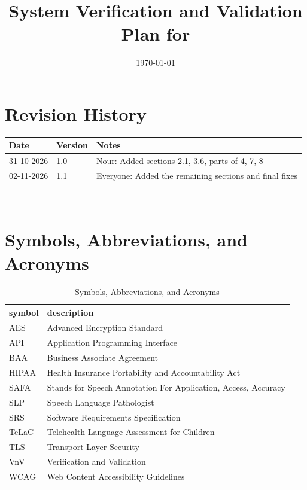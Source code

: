 \documentclass[12pt, titlepage]{article}
\renewcommand{\_}{\oldunderscore\allowbreak}
\begin{document}
\title{System Verification and Validation Plan for \progname{}} 
\author{\authname}
\date{\today}
	
\maketitle


\section*{Revision History}

\begin{tabularx}{\textwidth}{p{3cm}p{2cm}X}
\toprule {\bf Date} & {\bf Version} & {\bf Notes}\\
\midrule
31-10-2026 & 1.0 & Nour: Added sections 2.1, 3.6, parts of 4, 7, 8\\
02-11-2026 & 1.1 & Everyone: Added the remaining sections and final fixes\\
\bottomrule
\end{tabularx}

~\\

\newpage

\tableofcontents

\listoftables

\newpage

\section{Symbols, Abbreviations, and Acronyms}

\begin{table}[H]
\centering
\caption{Symbols, Abbreviations, and Acronyms}
\renewcommand{\arraystretch}{1.2}
\begin{tabular}{l l} 
  \toprule		
  \textbf{symbol} & \textbf{description}\\
  \midrule 
  AES & Advanced Encryption Standard \\
  API & Application Programming Interface \\
  BAA & Business Associate Agreement \\
  HIPAA & Health Insurance Portability and Accountability Act \\
  SAFA & Stands for Speech Annotation For Application, Access, Accuracy\\
  SLP & Speech Language Pathologist \\
  SRS & Software Requirements Specification \\
  TeLaC & Telehealth Language Assessment for Children \\
  TLS & Transport Layer Security \\
  VnV & Verification and Validation \\
  WCAG & Web Content Accessibility Guidelines \\
  \bottomrule
\end{tabular}
\end{table}
\end{document}
